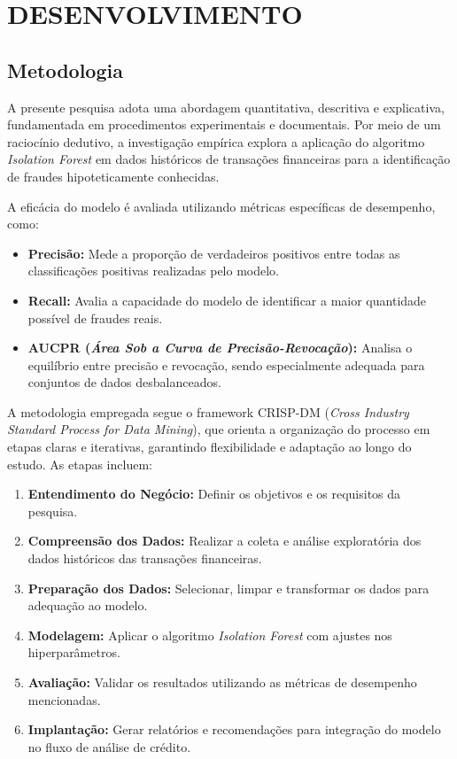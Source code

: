 \documentclass[12pt,a4paper]{article}
\begin{document}
\section{DESENVOLVIMENTO}
\subsection{Metodologia}

A presente pesquisa adota uma abordagem quantitativa, descritiva e explicativa, fundamentada em procedimentos experimentais e documentais. Por meio de um raciocínio dedutivo, a investigação empírica explora a aplicação do algoritmo \textit{Isolation Forest} em dados históricos de transações financeiras para a identificação de fraudes hipoteticamente conhecidas. 

A eficácia do modelo é avaliada utilizando métricas específicas de desempenho, como:
\begin{itemize}
    \item \textbf{Precisão:} Mede a proporção de verdadeiros positivos entre todas as classificações positivas realizadas pelo modelo.
    \item \textbf{Recall:} Avalia a capacidade do modelo de identificar a maior quantidade possível de fraudes reais.
    \item \textbf{AUCPR (\textit{Área Sob a Curva de Precisão-Revocação}):} Analisa o equilíbrio entre precisão e revocação, sendo especialmente adequada para conjuntos de dados desbalanceados.
\end{itemize}

A metodologia empregada segue o framework CRISP-DM (\textit{Cross Industry Standard Process for Data Mining}), que orienta a organização do processo em etapas claras e iterativas, garantindo flexibilidade e adaptação ao longo do estudo. As etapas incluem:
\begin{enumerate}
    \item \textbf{Entendimento do Negócio:} Definir os objetivos e os requisitos da pesquisa.
    \item \textbf{Compreensão dos Dados:} Realizar a coleta e análise exploratória dos dados históricos das transações financeiras.
    \item \textbf{Preparação dos Dados:} Selecionar, limpar e transformar os dados para adequação ao modelo.
    \item \textbf{Modelagem:} Aplicar o algoritmo \textit{Isolation Forest} com ajustes nos hiperparâmetros.
    \item \textbf{Avaliação:} Validar os resultados utilizando as métricas de desempenho mencionadas.
    \item \textbf{Implantação:} Gerar relatórios e recomendações para integração do modelo no fluxo de análise de crédito.
\end{enumerate}
\end{document}
